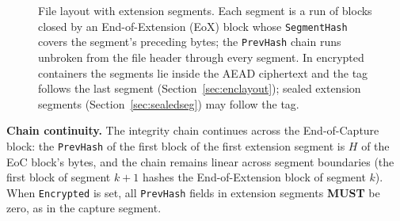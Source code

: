 \documentclass[11pt,a4paper]{article}
\newcommand{\MUST}{\textbf{MUST}}
\newcommand{\field}[1]{\texttt{#1}}
\begin{document}
\begin{figure}[H]
{}
\caption{File layout with extension segments. Each segment is a run of blocks closed by an End-of-Extension (EoX) block whose \field{SegmentHash} covers the segment's preceding bytes; the \field{PrevHash} chain runs unbroken from the file header through every segment. In encrypted containers the segments lie inside the AEAD ciphertext and the tag follows the last segment (Section~\ref{sec:enclayout}); sealed extension segments (Section~\ref{sec:sealedseg}) may follow the tag.}
\label{fig:ext-layout}
\end{figure}

\noindent\textbf{Chain continuity.} The integrity chain continues across the End-of-Capture block: the \field{PrevHash} of the first block of the first extension segment is $H$ of the EoC block's bytes, and the chain remains linear across segment boundaries (the first block of segment $k{+}1$ hashes the End-of-Extension block of segment $k$). When \field{Encrypted} is set, all \field{PrevHash} fields in extension segments \MUST{} be zero, as in the capture segment.
\end{document}
